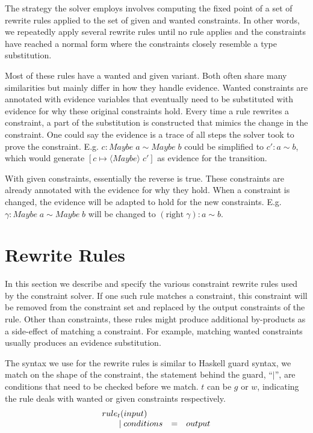 The strategy the solver employs involves computing the fixed point of a set of
rewrite rules applied to the set of given and wanted constraints. In other
words, we repeatedly apply several rewrite rules until no rule applies and the
constraints have reached a normal form where the constraints closely resemble a
type substitution.

Most of these rules have a wanted and given variant. Both often share many
similarities but mainly differ in how they handle evidence. Wanted constraints
are annotated with evidence variables that eventually need to be substituted
with evidence for why these original constraints hold. Every time a rule
rewrites a constraint, a part of the substitution is constructed that mimics the
change in the constraint. One could say the evidence is a trace of all steps the
solver took to prove the constraint. E.g. $c : Maybe \; a \sim Maybe \; b$ could
be simplified to $c': a \sim b$, which would generate $[c \mapsto \langle Maybe
\rangle \; c']$ as evidence for the transition.

With given constraints, essentially the reverse is true. These constraints are
already annotated with the evidence for why they hold. When a constraint is
changed, the evidence will be adapted to hold for the new constraints. E.g.
$\gamma : Maybe \; a \sim Maybe \; b$ will be changed to $(\text{right}\; \gamma) :
a \sim b$.

\section{Rewrite Rules}
In this section we describe and specify the various constraint rewrite rules
used by the constraint solver. If one such rule matches a constraint, this
constraint will be removed from the constraint set and replaced by the output
constraints of the rule. Other than constraints, these rules might produce
additional by-products as a side-effect of matching a constraint. For example,
matching wanted constraints usually produces an evidence substitution.

The syntax we use for the rewrite rules is similar to Haskell guard syntax, we
match on the shape of the constraint, the statement behind the guard,
``$\mid$'', are conditions that need to be checked before we match. $t$ can be
$g$ or $w$, indicating the rule deals with wanted or given constraints
respectively.
\[
\begin{array}{l c l}
rule_t(input)
\\\qquad \mid conditions &=& output
\end{array}
\]

